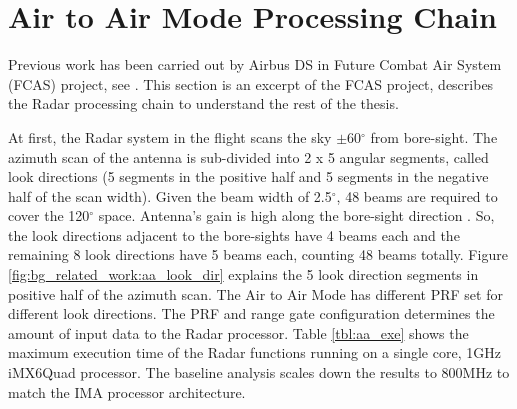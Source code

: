
\section{Air to Air Mode Processing Chain}
\label{sec:bg_related_work:proc_chain}
Previous work has been carried out by Airbus DS in Future Combat Air System (FCAS) project, see \cite{fcas}. This section is an excerpt of the FCAS project, describes the Radar processing chain to understand the rest of the thesis.

At first, the Radar system in the flight scans the sky $\pm$60$^{\circ}$ from bore-sight. The azimuth scan of the antenna is sub-divided into 2 x 5 angular segments, called look directions (5 segments in the positive half and 5 segments in the negative half of the scan width). Given the beam width of 2.5$^{\circ}$, 48 beams are required to cover the 120$^{\circ}$ space. Antenna's gain is high along the bore-sight direction \cite{boreSight}\cite{bsTR}. So, the look directions adjacent to the bore-sights have 4 beams each and the remaining 8 look directions have 5 beams each, counting 48 beams totally. Figure \ref{fig:bg_related_work:aa_look_dir} explains the 5 look direction segments in positive half of the azimuth scan. The Air to Air Mode has different PRF set for different look directions. The PRF and range gate configuration determines the amount of input data to the Radar processor. Table \ref{tbl:aa_exe} shows the maximum execution time of the Radar functions running on a single core, 1GHz iMX6Quad processor. The baseline analysis scales down the results to 800MHz to match the IMA processor architecture.

